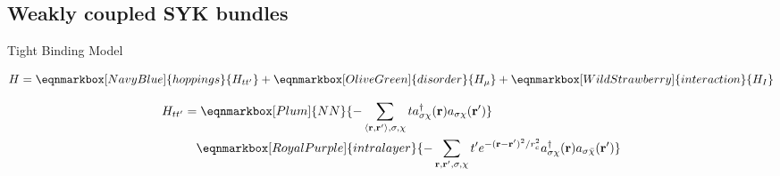 \subsection{Weakly coupled SYK bundles}
\begin{frame}{Tight Binding Model}

\begin{equation*}
    H = \eqnmarkbox[NavyBlue]{hoppings}{H_{tt'}}
    + \eqnmarkbox[OliveGreen]{disorder}{H_{\mu}}
    + \eqnmarkbox[WildStrawberry]{interaction}{H_{I}}
\end{equation*}

\begin{equation*}
\begin{aligned}
    H_{tt'} &= \eqnmarkbox[Plum]{NN}{-\sum_{\langle \mathbf{r}, \mathbf{r}' \rangle, \sigma, \chi} t a^{\dagger}_{\sigma \chi}(\mathbf{r}) a_{\sigma \chi}(\mathbf{r}')} \\
    &\quad \eqnmarkbox[RoyalPurple]{intralayer}{- \sum_{\mathbf{r}, \mathbf{r}' , \sigma, \chi} t' e^{-(\mathbf{r} - \mathbf{r}')^2 / r_c^2} a^{\dagger}_{\sigma \chi}(\mathbf{r}) a_{\sigma \bar{\chi}}(\mathbf{r}')}
\end{aligned}
\end{equation*}
\end{frame}
